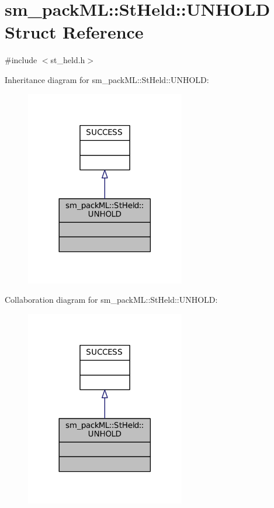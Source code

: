 \hypertarget{structsm__packML_1_1StHeld_1_1UNHOLD}{}\section{sm\+\_\+pack\+ML\+:\+:St\+Held\+:\+:U\+N\+H\+O\+LD Struct Reference}
\label{structsm__packML_1_1StHeld_1_1UNHOLD}


{\ttfamily \#include $<$st\+\_\+held.\+h$>$}



Inheritance diagram for sm\+\_\+pack\+ML\+:\+:St\+Held\+:\+:U\+N\+H\+O\+LD\+:
\nopagebreak
\begin{figure}[H]
\begin{center}
\leavevmode
\includegraphics[width=197pt]{structsm__packML_1_1StHeld_1_1UNHOLD__inherit__graph}
\end{center}
\end{figure}


Collaboration diagram for sm\+\_\+pack\+ML\+:\+:St\+Held\+:\+:U\+N\+H\+O\+LD\+:
\nopagebreak
\begin{figure}[H]
\begin{center}
\leavevmode
\includegraphics[width=197pt]{structsm__packML_1_1StHeld_1_1UNHOLD__coll__graph}
\end{center}
\end{figure}


